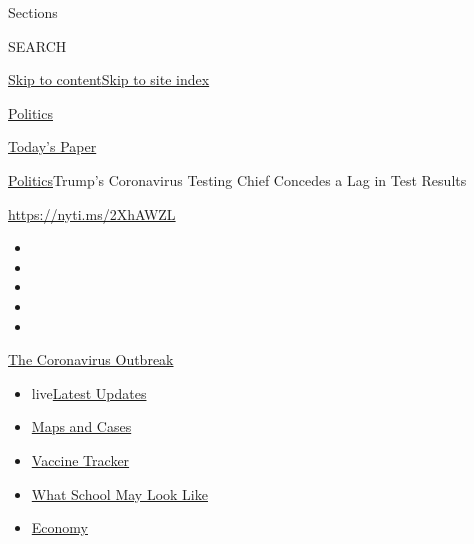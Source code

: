 Sections

SEARCH

\protect\hyperlink{site-content}{Skip to
content}\protect\hyperlink{site-index}{Skip to site index}

\href{https://www.nytimes.com/section/politics}{Politics}

\href{https://myaccount.nytimes.com/auth/login?response_type=cookie\&client_id=vi}{}

\href{https://www.nytimes.com/section/todayspaper}{Today's Paper}

\href{/section/politics}{Politics}\textbar{}Trump's Coronavirus Testing
Chief Concedes a Lag in Test Results

\url{https://nyti.ms/2XhAWZL}

\begin{itemize}
\item
\item
\item
\item
\item
\end{itemize}

\href{https://www.nytimes.com/news-event/coronavirus?action=click\&pgtype=Article\&state=default\&region=TOP_BANNER\&context=storylines_menu}{The
Coronavirus Outbreak}

\begin{itemize}
\tightlist
\item
  live\href{https://www.nytimes.com/2020/08/01/world/coronavirus-covid-19.html?action=click\&pgtype=Article\&state=default\&region=TOP_BANNER\&context=storylines_menu}{Latest
  Updates}
\item
  \href{https://www.nytimes.com/interactive/2020/us/coronavirus-us-cases.html?action=click\&pgtype=Article\&state=default\&region=TOP_BANNER\&context=storylines_menu}{Maps
  and Cases}
\item
  \href{https://www.nytimes.com/interactive/2020/science/coronavirus-vaccine-tracker.html?action=click\&pgtype=Article\&state=default\&region=TOP_BANNER\&context=storylines_menu}{Vaccine
  Tracker}
\item
  \href{https://www.nytimes.com/interactive/2020/07/29/us/schools-reopening-coronavirus.html?action=click\&pgtype=Article\&state=default\&region=TOP_BANNER\&context=storylines_menu}{What
  School May Look Like}
\item
  \href{https://www.nytimes.com/live/2020/07/31/business/stock-market-today-coronavirus?action=click\&pgtype=Article\&state=default\&region=TOP_BANNER\&context=storylines_menu}{Economy}
\end{itemize}


